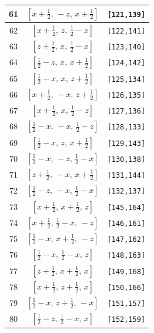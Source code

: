 \documentclass[fleqn,8pt]{jsarticle}
\begin{document}
\begin{longtable}{ccc}
61 & $\left[ x + \frac{1}{2},\, - z,\, x + \frac{1}{2} \right]$ & {\tt [121,139]} \\ \hline
62 & $\left[ x + \frac{1}{2},\, z,\, \frac{1}{2} - x \right]$ & {\tt [122,141]} \\ \hline
63 & $\left[ z + \frac{1}{2},\, x,\, \frac{1}{2} - x \right]$ & {\tt [123,140]} \\ \hline
64 & $\left[ \frac{1}{2} - z,\, x,\, x + \frac{1}{2} \right]$ & {\tt [124,142]} \\ \hline
65 & $\left[ \frac{1}{2} - x,\, x,\, z + \frac{1}{2} \right]$ & {\tt [125,134]} \\ \hline
66 & $\left[ x + \frac{1}{2},\, - x,\, z + \frac{1}{2} \right]$ & {\tt [126,135]} \\ \hline
67 & $\left[ x + \frac{1}{2},\, x,\, \frac{1}{2} - z \right]$ & {\tt [127,136]} \\ \hline
68 & $\left[ \frac{1}{2} - x,\, - x,\, \frac{1}{2} - z \right]$ & {\tt [128,133]} \\ \hline
69 & $\left[ \frac{1}{2} - x,\, z,\, x + \frac{1}{2} \right]$ & {\tt [129,143]} \\ \hline
70 & $\left[ \frac{1}{2} - x,\, - z,\, \frac{1}{2} - x \right]$ & {\tt [130,138]} \\ \hline
71 & $\left[ z + \frac{1}{2},\, - x,\, x + \frac{1}{2} \right]$ & {\tt [131,144]} \\ \hline
72 & $\left[ \frac{1}{2} - z,\, - x,\, \frac{1}{2} - x \right]$ & {\tt [132,137]} \\ \hline
73 & $\left[ x + \frac{1}{2},\, x + \frac{1}{2},\, z \right]$ & {\tt [145,164]} \\ \hline
74 & $\left[ x + \frac{1}{2},\, \frac{1}{2} - x,\, - z \right]$ & {\tt [146,161]} \\ \hline
75 & $\left[ \frac{1}{2} - x,\, x + \frac{1}{2},\, - z \right]$ & {\tt [147,162]} \\ \hline
76 & $\left[ \frac{1}{2} - x,\, \frac{1}{2} - x,\, z \right]$ & {\tt [148,163]} \\ \hline
77 & $\left[ z + \frac{1}{2},\, x + \frac{1}{2},\, x \right]$ & {\tt [149,168]} \\ \hline
78 & $\left[ x + \frac{1}{2},\, z + \frac{1}{2},\, x \right]$ & {\tt [150,166]} \\ \hline
79 & $\left[ \frac{1}{2} - x,\, z + \frac{1}{2},\, - x \right]$ & {\tt [151,157]} \\ \hline
80 & $\left[ \frac{1}{2} - z,\, \frac{1}{2} - x,\, x \right]$ & {\tt [152,159]} \\ \hline

\end{longtable}
\end{document}
